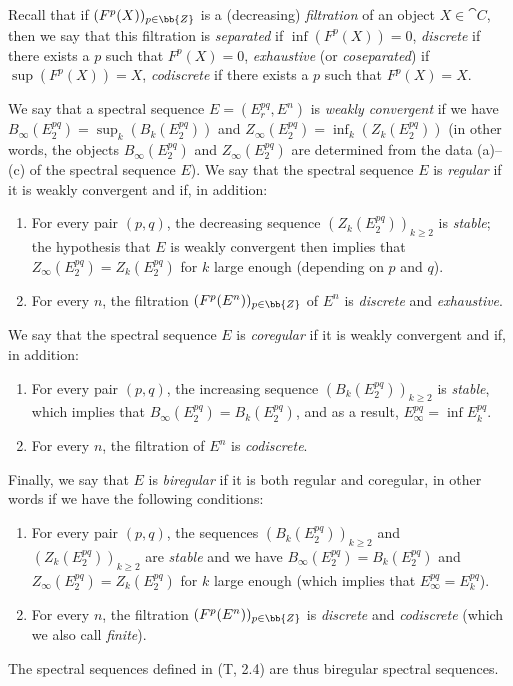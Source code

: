 \begin{env}[11.1.3]
\label{0.11.1.3}
Recall that if $(F^p(X))_{p\in\bb{Z}}$ is a (decreasing) \emph{filtration} of an object $X\in\cat{C}$, then we say that this filtration is \emph{separated} if $\inf(F^p(X))=0$, \emph{discrete} if there exists a $p$ such that $F^p(X)=0$, \emph{exhaustive} (or \emph{coseparated}) if $\sup(F^p(X))=X$, \emph{codiscrete} if there exists a $p$ such that $F^p(X)=X$.

We say that a spectral sequence $E=(E_r^{pq},E^n)$ is \emph{weakly convergent} if we have $B_\infty(E_2^{pq})=\sup_k(B_k(E_2^{pq}))$ and $Z_\infty(E_2^{pq})=\inf_k(Z_k(E_2^{pq}))$ (in other words, the objects $B_\infty(E_2^{pq})$ and $Z_\infty(E_2^{pq})$ are determined from the data (a)--(c) of the spectral sequence $E$).
We say that the spectral sequence $E$ is \emph{regular} if it is weakly convergent and if, in addition:
\begin{enumerate}
  \item[(1st)] For every pair $(p,q)$, the decreasing sequence $(Z_k(E_2^{pq}))_{k\geq 2}$ is \emph{stable}; the hypothesis that $E$ is weakly convergent then implies that $Z_\infty(E_2^{pq})=Z_k(E_2^{pq})$ for $k$ large enough (depending on $p$ and $q$).
  \item[(2nd)] For every $n$, the filtration $(F^p(E^n))_{p\in\bb{Z}}$ of $E^n$ is \emph{discrete} and \emph{exhaustive}.
\end{enumerate}

We say that the spectral sequence $E$ is \emph{coregular} if it is weakly convergent and if, in addition:
\begin{enumerate}
  \item[(3rd)] For every pair $(p,q)$, the increasing sequence $(B_k(E_2^{pq}))_{k\geq 2}$ is \emph{stable}, which implies that $B_\infty(E_2^{pq})=B_k(E_2^{pq})$, and as a result, $E_\infty^{pq}=\inf E_k^{pq}$.
  \item[(4th)] For every $n$, the filtration of $E^n$ is \emph{codiscrete}.
\end{enumerate}

Finally, we say that $E$ is \emph{biregular} if it is both regular and coregular, in other words if we have the following conditions:
\begin{enumerate}
  \item[(a)] For every pair $(p,q)$, the sequences $(B_k(E_2^{pq}))_{k\geq 2}$ and $(Z_k(E_2^{pq}))_{k\geq 2}$ are \emph{stable} and we have $B_\infty(E_2^{pq})=B_k(E_2^{pq})$ and $Z_\infty(E_2^{pq})=Z_k(E_2^{pq})$ for $k$ large enough (which implies that $E_\infty^{pq}=E_k^{pq}$).
  \item[(b)] For every $n$, the filtration $(F^p(E^n))_{p\in\bb{Z}}$ is \emph{discrete} and \emph{codiscrete} (which we also call \emph{finite}).
\end{enumerate}

The spectral sequences defined in (T, 2.4) are thus biregular spectral sequences.
\end{env}

